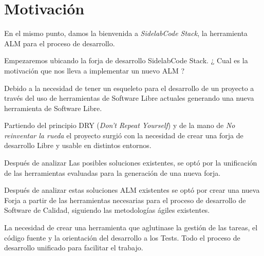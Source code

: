 %
% 

\chapter{Motivaci\'on}
\label{chap:motivacion}

\par En el mismo punto, damos la bienvenida a \emph{SidelabCode Stack}, la herramienta ALM para el proceso de desarrollo.

\par Empezaremos ubicando la forja de desarrollo SidelabCode Stack. ¿ Cual es la motivaci\'on que nos lleva a implementar un nuevo ALM ?

\par Debido a la necesidad de tener un esqueleto para el desarrollo de un proyecto a trav\'es del uso de herramientas de Software Libre actuales generando una nueva herramienta de Software Libre.

\par Partiendo del principio DRY (\emph{Don't Repeat Yourself}) y de la mano de \emph{No reinventar la rueda} el proyecto surgi\'o con la necesidad de crear una forja de desarrollo Libre y usable en distintos entornos.

\par Despu\'es de analizar Las posibles soluciones existentes, se opt\'o por la unificaci\'on de las herramientas evaluadas para la generaci\'on de una nueva forja. 

\par Despu\'es de analizar estas soluciones ALM existentes se opt\'o por crear una nueva Forja a partir de las herramientas necesarias para el proceso de desarrollo de Software de Calidad, siguiendo las metodolog\'ias \'agiles existentes.

\par La necesidad de crear una herramienta que aglutinase la gestión de las tareas, el código fuente y la orientación del desarrollo a los Tests. Todo el proceso de desarrollo unificado para facilitar el trabajo.

